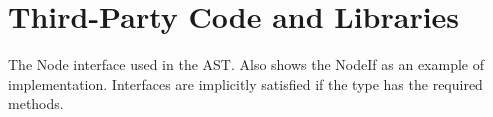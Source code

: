 \chapter{Third-Party Code and Libraries}







\caption[fnmatch]{The Node interface used in the AST. Also shows the NodeIf as an example of implementation. Interfaces are implicitly satisfied if the type has the required methods. \label{lst:fnmatch}}

